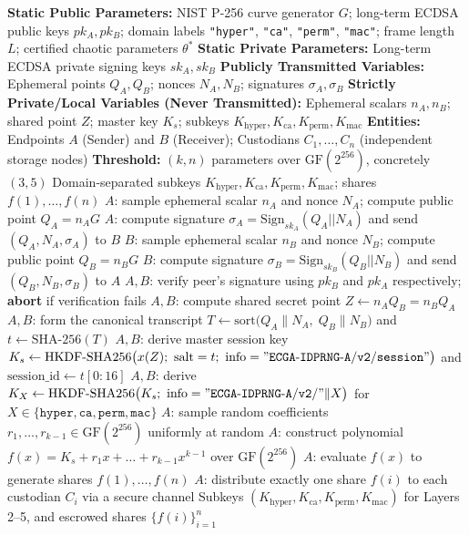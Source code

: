 \documentclass[pdflatex,sn-mathphys-num]{sn-jnl}%
\theoremstyle{thmstyleone}%
\theoremstyle{thmstyletwo}%
\theoremstyle{thmstylethree}%
\begin{document}
\begin{algorithm}[htbp]
\caption{Authenticated session-key agreement, subkey derivation, and $(k,n)$ threshold escrow}
\label{alg:ecdh}
\begin{algorithmic}[1]
\Require 
    \Statex \textbf{Static Public Parameters:} NIST P-256 curve generator $G$; long-term ECDSA public keys $pk_A, pk_B$; domain labels \texttt{"hyper"}, \texttt{"ca"}, \texttt{"perm"}, \texttt{"mac"}; frame length $L$; certified chaotic parameters $\theta^\ast$
    \Statex \textbf{Static Private Parameters:} Long-term ECDSA private signing keys $sk_A, sk_B$
    \Statex \textbf{Publicly Transmitted Variables:} Ephemeral points $Q_A, Q_B$; nonces $N_A, N_B$; signatures $\sigma_A, \sigma_B$
    \Statex \textbf{Strictly Private/Local Variables (Never Transmitted):} Ephemeral scalars $n_A, n_B$; shared point $Z$; master key $K_s$; subkeys $K_{\mathrm{hyper}}, K_{\mathrm{ca}}, K_{\mathrm{perm}}, K_{\mathrm{mac}}$
    \Statex \textbf{Entities:} Endpoints $A$ (Sender) and $B$ (Receiver); Custodians $C_1, \dots, C_n$ (independent storage nodes)
    \Statex \textbf{Threshold:} $(k,n)$ parameters over $\mathrm{GF}(2^{256})$, concretely $(3,5)$
\Ensure Domain-separated subkeys $K_{\mathrm{hyper}}, K_{\mathrm{ca}}, K_{\mathrm{perm}}, K_{\mathrm{mac}}$; shares $f(1),\dots,f(n)$
\State $A$: sample ephemeral scalar $n_A$ and nonce $N_A$; compute public point $Q_A=n_A G$
\State $A$: compute signature $\sigma_A = \mathrm{Sign}_{sk_A}(Q_A||N_A)$ and send $(Q_A, N_A, \sigma_A)$ to $B$
\State $B$: sample ephemeral scalar $n_B$ and nonce $N_B$; compute public point $Q_B=n_B G$
\State $B$: compute signature $\sigma_B = \mathrm{Sign}_{sk_B}(Q_B||N_B)$ and send $(Q_B, N_B, \sigma_B)$ to $A$
\State $A, B$: verify peer's signature using $pk_B$ and $pk_A$ respectively; \textbf{abort} if verification fails
\State $A, B$: compute shared secret point $Z \gets n_A Q_B = n_B Q_A$
\State $A, B$: form the canonical transcript $T \gets \mathrm{sort}\big(Q_A\|N_A,\; Q_B\|N_B\big)$ and $t \gets \mathrm{SHA\text{-}256}(T)$ 
\State $A, B$: derive master session key $K_s \gets \mathrm{HKDF\text{-}SHA256}\big(x(Z);\ \mathrm{salt}=t;\ \mathrm{info}=\mathtt{"ECGA\text{-}IDPRNG\text{-}A/v2/session"}\big)$ and $\mathrm{session\_id} \gets t[0{:}16]$
\State $A, B$: derive $K_X \gets \mathrm{HKDF\text{-}SHA256}\big(K_s;\ \mathrm{info}=\mathtt{"ECGA\text{-}IDPRNG\text{-}A/v2/"}\|X\big)$ for $X \in \{\mathtt{hyper}, \mathtt{ca}, \mathtt{perm}, \mathtt{mac}\}$
\State $A$: sample random coefficients $r_1,\dots,r_{k-1} \in \mathrm{GF}(2^{256})$ uniformly at random
\State $A$: construct polynomial $f(x) = K_s + r_1x + \dots + r_{k-1}x^{k-1}$ over $\mathrm{GF}(2^{256})$
\State $A$: evaluate $f(x)$ to generate shares $f(1), \dots, f(n)$
\State $A$: distribute exactly one share $f(i)$ to each custodian $C_i$ via a secure channel
\State \Return Subkeys $(K_{\mathrm{hyper}}, K_{\mathrm{ca}}, K_{\mathrm{perm}}, K_{\mathrm{mac}})$ for Layers 2--5, and escrowed shares $\{f(i)\}_{i=1}^{n}$
\end{algorithmic}
\end{algorithm}
\end{document}
